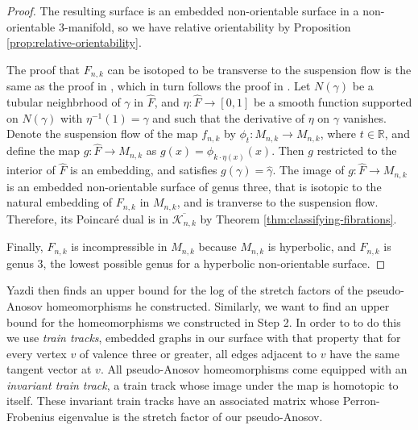 \begin{proof}
  The resulting surface is an embedded non-orientable surface in a non-orientable $3$-manifold, so we have
  relative orientability by Proposition \ref{prop:relative-orientability}.

  The proof that $F_{n,k}$ can be isotoped to be transverse to the suspension flow is the same as the
  proof in \cite{yazdi2018pseudo}, which in turn follows the proof in \cite{leininger2013number}. Let $N(\gamma)$ be a tubular neighbrhood of $\gamma$ in $\hat{F}$, and $\eta: \hat{F} \xrightarrow{} [0,1]$ be a smooth function supported on $N(\gamma)$ with $\eta^{-1}(1) = \gamma$ and such that the derivative of $\eta$ on $\gamma$ vanishes. Denote the suspension flow of the map $f_{n,k}$ by $\phi_t: M_{n,k} \xrightarrow{} M_{n,k}$, where $t \in \mathbb{R}$, and define the map $g: \hat{F} \xrightarrow{} M_{n,k}$ as $g(x) = \phi_{k\cdot \eta(x)}(x)$. Then $g$ restricted to the interior of $\hat{F}$ is an embedding, and satisfies $g(\gamma) = \hat{\gamma}$. The image of $g: \hat{F} \xrightarrow{} M_{n,k}$ is an embedded non-orientable surface of genus three, that is isotopic to the natural embedding of $F_{n,k}$ in $M_{n,k}$, and is tranverse to the suspension flow.  
  Therefore, its Poincar\'e dual is in $\overline{\mathcal{K}_{n,k}}$ by Theorem \ref{thm:classifying-fibrations}.
   
  Finally, $F_{n,k}$ is incompressible in $M_{n,k}$ because $M_{n,k}$ is hyperbolic, and $F_{n,k}$ is genus $3$, the
  lowest possible genus for a hyperbolic non-orientable surface.
\end{proof}


Yazdi then finds an upper bound for the log of the stretch factors of the pseudo-Anosov homeomorphisms he constructed. Similarly, we want to find an upper bound for the homeomorphisms we constructed in Step 2.  In order to to do this we use \textit{train tracks}, embedded graphs in our surface with that property that for every vertex $v$ of valence three or greater, all edges adjacent to $v$ have the same tangent vector at $v$. All pseudo-Anosov homeomorphisms come equipped with an \textit{invariant train track}, a train track whose image under the map is homotopic to itself. These invariant train tracks have an associated matrix whose Perron-Frobenius eigenvalue is the stretch factor of our pseudo-Anosov.

